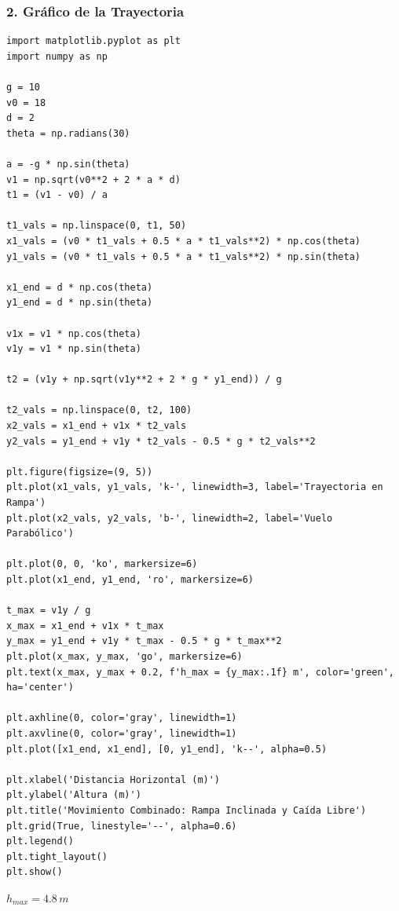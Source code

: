 \documentclass[12pt, a4paper]{article}
\begin{document}
\subsubsection*{2. Gráfico de la Trayectoria}
\begin{verbatim}
import matplotlib.pyplot as plt
import numpy as np

g = 10
v0 = 18
d = 2
theta = np.radians(30)

a = -g * np.sin(theta)
v1 = np.sqrt(v0**2 + 2 * a * d)
t1 = (v1 - v0) / a

t1_vals = np.linspace(0, t1, 50)
x1_vals = (v0 * t1_vals + 0.5 * a * t1_vals**2) * np.cos(theta)
y1_vals = (v0 * t1_vals + 0.5 * a * t1_vals**2) * np.sin(theta)

x1_end = d * np.cos(theta)
y1_end = d * np.sin(theta)

v1x = v1 * np.cos(theta)
v1y = v1 * np.sin(theta)

t2 = (v1y + np.sqrt(v1y**2 + 2 * g * y1_end)) / g

t2_vals = np.linspace(0, t2, 100)
x2_vals = x1_end + v1x * t2_vals
y2_vals = y1_end + v1y * t2_vals - 0.5 * g * t2_vals**2

plt.figure(figsize=(9, 5))
plt.plot(x1_vals, y1_vals, 'k-', linewidth=3, label='Trayectoria en Rampa')
plt.plot(x2_vals, y2_vals, 'b-', linewidth=2, label='Vuelo Parabólico')

plt.plot(0, 0, 'ko', markersize=6)
plt.plot(x1_end, y1_end, 'ro', markersize=6)

t_max = v1y / g
x_max = x1_end + v1x * t_max
y_max = y1_end + v1y * t_max - 0.5 * g * t_max**2
plt.plot(x_max, y_max, 'go', markersize=6)
plt.text(x_max, y_max + 0.2, f'h_max = {y_max:.1f} m', color='green', ha='center')

plt.axhline(0, color='gray', linewidth=1)
plt.axvline(0, color='gray', linewidth=1)
plt.plot([x1_end, x1_end], [0, y1_end], 'k--', alpha=0.5)

plt.xlabel('Distancia Horizontal (m)')
plt.ylabel('Altura (m)')
plt.title('Movimiento Combinado: Rampa Inclinada y Caída Libre')
plt.grid(True, linestyle='--', alpha=0.6)
plt.legend()
plt.tight_layout()
plt.show()
\end{verbatim}

\begin{tcolorbox}[colback=green!5!white, colframe=green!50!black, title=Respuesta Final]
\centering \Large $h_{max} = 4.8 \, \si{m}$
\end{tcolorbox}

\newpage
\end{document}
